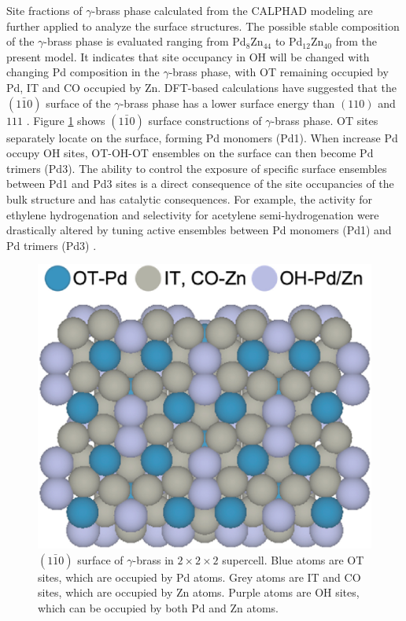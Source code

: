 Site fractions of $\gamma$-brass phase calculated from the CALPHAD modeling are further applied to analyze the surface structures. The possible stable composition of the $\gamma$-brass phase is evaluated ranging from Pd$_8$Zn$_{44}$ to Pd$_{12}$Zn$_{40}$ from the present model. It indicates that site occupancy in OH will be changed with changing Pd composition in the $\gamma$-brass phase, with OT remaining occupied by Pd, IT and CO occupied by Zn. DFT-based calculations have suggested that the $(1\bar{1}0)$ surface of the $\gamma$-brass phase has a lower surface energy than $(110)$ and ${111}$ \cite{Dasgupta2022}. Figure \ref{intermetallics:fig:PdZnSurface} shows $(1\bar{1}0)$ surface constructions of $\gamma$-brass phase. OT sites separately locate on the surface, forming Pd monomers (Pd1). When increase Pd occupy OH sites, OT-OH-OT ensembles on the surface can then become Pd trimers (Pd3). The ability to control the exposure of specific surface ensembles between Pd1 and Pd3 sites is a direct consequence of the site occupancies of the bulk structure and has catalytic consequences. For example, the activity for ethylene hydrogenation and selectivity for acetylene semi-hydrogenation were drastically altered by tuning active ensembles between Pd monomers (Pd1) and Pd trimers (Pd3) \cite{Dasgupta2022}. 

\begin{figure}[H]
    \centering
    \includegraphics[width=0.4\linewidth]{intermetallics/Intermetallics-PdZnSurface.jpg}
    \caption{$(1\bar{1}0)$ surface of $\gamma$-brass in $2\times2\times2$ supercell. Blue atoms are OT sites, which are occupied by Pd atoms. Grey atoms are IT and CO sites, which are occupied by Zn atoms. Purple atoms are OH sites, which can be occupied by both Pd and Zn atoms.}
    \label{intermetallics:fig:PdZnSurface}
\end{figure}

